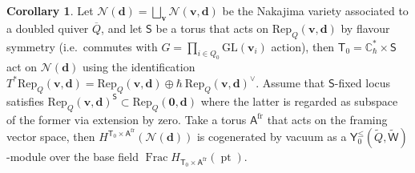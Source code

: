 \documentclass[10pt]{amsart}
\theoremstyle{definition}
\newtheorem{Corollary}[Theorem]{Corollary}
\numberwithin{equation}{section}
\newcommand{\GL}{\mathrm{GL}}
\newcommand{\bC}{\mathbb{C}}
\newcommand{\bv}{\mathbf{v}}
\newcommand{\bd}{\mathbf{d}}
\newcommand{\cN}{\mathcal{N}}
\newcommand{\sA}{\mathsf{A}}
\newcommand{\sT}{\mathsf{T}}
\newcommand{\sW}{\mathsf{W}}
\newcommand{\Frac}{\operatorname{Frac}}
\newcommand{\pt}{\operatorname{pt}}
\begin{document}
\begin{Corollary}\label{cor cogen_nak}
Let $\cN(\bd)=\bigsqcup_{\bv}\cN(\bv,\bd)$ be the Nakajima variety associated to a doubled quiver $\overline{Q}$, and let $\mathsf{S}$ be a torus that acts on $\mathrm{Rep}_{Q}(\bv,\bd)$ by flavour symmetry (i.e.~commutes with $G=\prod_{i\in Q_0}\GL(\bv_i)$ action), then $\sT_0=\bC^*_\hbar\times \mathsf{S}$ act on $\cN(\bd)$ using the identification $T^*\mathrm{Rep}_{Q}(\bv,\bd)=\mathrm{Rep}_{Q}(\bv,\bd)\oplus \hbar\:\mathrm{Rep}_{Q}(\bv,\bd)^{\vee}$. Assume that $\mathsf S$-fixed locus satisfies $\mathrm{Rep}_{Q}(\bv,\bd)^{\mathsf S}\subset\mathrm{Rep}_{Q}(\mathbf 0,\bd)$ where the latter is regarded as subspace of the former via extension by zero. Take a torus $\sA^{\mathrm{fr}}$ that acts on the framing vector space, then $H^{\sT_0\times \sA^{\mathrm{fr}}}(\cN(\bd))$ is cogenerated by vacuum as a $\mathsf Y_0^{\leqslant}(\widetilde Q,\widetilde{\sW})$-module over the base field $\Frac H_{\sT_0\times \sA^{\mathrm{fr}}}(\pt)$.
\end{Corollary}
\end{document}
